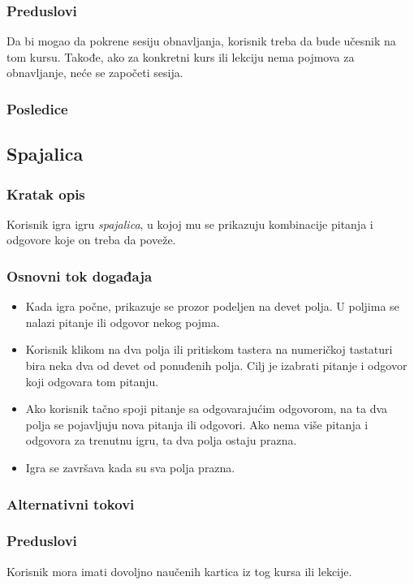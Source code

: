 \subsubsection{Preduslovi}
Da bi mogao da pokrene sesiju obnavljanja, korisnik treba da bude učesnik na tom kursu.
Takođe, ako za konkretni kurs ili lekciju nema pojmova za obnavljanje, neće se započeti sesija.
\subsubsection{Posledice}




\subsection{Spajalica}
\label{subsec:spajalica}

\subsubsection{Kratak opis}
Korisnik igra igru \emph{spajalica}, u kojoj mu se prikazuju kombinacije pitanja i odgovore koje on treba da poveže.
\subsubsection{Osnovni tok događaja}
\begin{itemize}
  \item
  Kada igra počne, prikazuje se prozor podeljen na devet polja.
  U poljima se nalazi pitanje ili odgovor nekog pojma.
  \item
  Korisnik klikom na dva polja ili pritiskom tastera na numeričkoj tastaturi bira neka dva od devet od ponuđenih polja.
  Cilj je izabrati pitanje i odgovor koji odgovara tom pitanju.
  \item
  Ako korisnik tačno spoji pitanje sa odgovarajućim odgovorom, na ta dva polja se pojavljuju nova pitanja ili odgovori.
  Ako nema više pitanja i odgovora za trenutnu igru, ta dva polja ostaju prazna.
  \item
  Igra se završava kada su sva polja prazna.
\end{itemize}
\subsubsection{Alternativni tokovi}

\subsubsection{Preduslovi}
Korisnik mora imati dovoljno naučenih kartica iz tog kursa ili lekcije.
